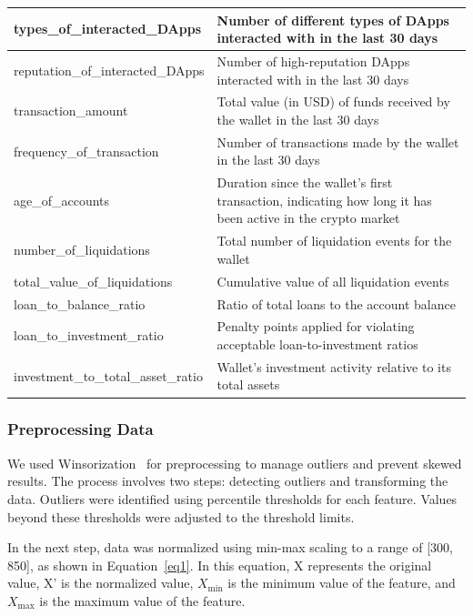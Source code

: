 \documentclass[runningheads]{llncs}
\begin{document}
{\begin{table}[htbp]
\begin{tabular}{|l|m{8.5cm}|}
        types\_of\_interacted\_DApps & Number of different types of DApps interacted with in the last 30 days \\ \hline
        reputation\_of\_interacted\_DApps & Number of high-reputation DApps interacted with in the last 30 days \\ \hline
        transaction\_amount & Total value (in USD) of funds received by the wallet in the last 30 days \\ \hline
        frequency\_of\_transaction & Number of transactions made by the wallet in the last 30 days \\ \hline
        age\_of\_accounts & Duration since the wallet’s first transaction, indicating how long it has been active in the crypto market \\ \hline
        number\_of\_liquidations & Total number of liquidation events for the wallet \\ \hline
        total\_value\_of\_liquidations & Cumulative value of all liquidation events \\ \hline
        loan\_to\_balance\_ratio & Ratio of total loans to the account balance  \\ \hline
        loan\_to\_investment\_ratio & Penalty points applied for violating acceptable loan-to-investment ratios \\ \hline
        investment\_to\_total\_asset\_ratio & Wallet's investment activity relative to its total assets \\ \hline
    \end{tabular}
    \label{tab:parameters} %
\end{table}

%
\subsubsection{Preprocessing Data}
We used Winsorization~\cite{dixon1974trimming} for preprocessing to manage outliers and prevent skewed results. The process involves two steps: detecting outliers and transforming the data. Outliers were identified using percentile thresholds for each feature. Values beyond these thresholds were adjusted to the threshold limits.


In the next step, data was normalized using min-max scaling to a range of [300, 850], as shown in Equation~\ref{eq1}. In this equation, X represents the original value, X' is the normalized value, $X_{\text{min}}$ is the minimum value of the feature, and $X_{\text{max}}$ is the maximum value of the feature.

}
\end{document}
